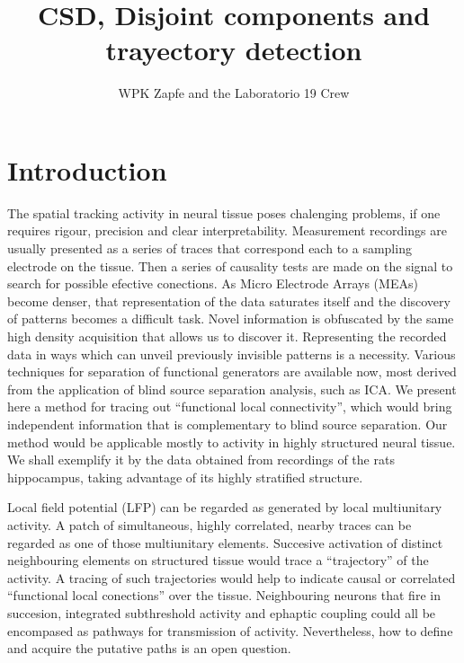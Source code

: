 \documentclass[12pt]{article}
\author{WPK Zapfe and the Laboratorio 19 Crew}
\title{CSD, Disjoint components and trayectory detection}
\begin{document}
\maketitle

\section{Introduction}

The spatial tracking activity in neural tissue poses chalenging problems,
if one requires rigour, precision and clear interpretability. 
Measurement recordings
are usually presented  as a series of traces that correspond each to a sampling
electrode on the tissue. Then a series of causality tests are made on the
signal to search for possible efective conections. 
As Micro Electrode Arrays (MEAs) become denser, that representation
of the data saturates itself  and the discovery of patterns becomes a difficult task.
Novel information is obfuscated by the same high density acquisition that allows us to
discover it. Representing  the recorded data in ways which can unveil previously
invisible patterns is a necessity. Various techniques for separation of functional
generators are available now, most derived from the application of blind source
separation analysis, such as ICA. 
We present here  a method for tracing out
``functional local connectivity'', which would bring independent information
that is complementary to blind source separation.
Our  method would be applicable mostly to
activity in highly structured neural tissue. We shall exemplify it by
the data obtained from recordings of the rats hippocampus,
taking advantage of its highly stratified  structure. 

Local field potential (LFP)
can be regarded as generated by local multiunitary activity.
A patch of simultaneous, highly correlated, nearby traces
can be regarded as one of those multiunitary elements. 
Succesive activation  of distinct neighbouring elements on structured
tissue would trace a
``trajectory'' of the activity. A tracing of such trajectories would help to indicate
causal or correlated ``functional local conections'' over the tissue. Neighbouring
neurons that fire in succesion, integrated subthreshold activity and ephaptic coupling
could all be encompased as pathways for transmission of activity. Nevertheless,
how to define and acquire the putative paths is an open question.
\end{document}
